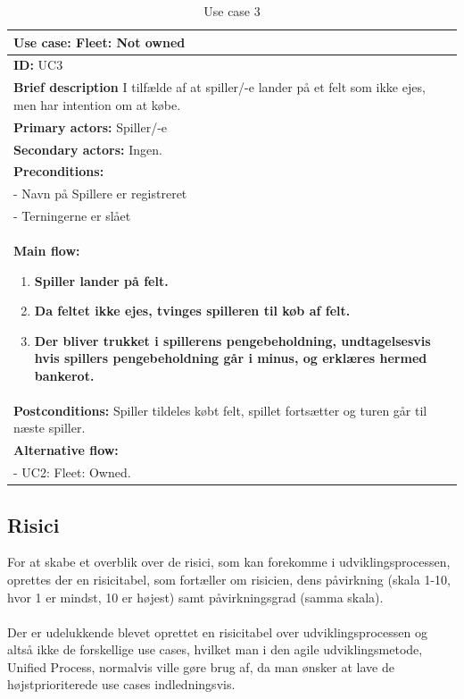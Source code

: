 \begin{table}[H]
    \begin{center}
        \begin{tabular}{ | p{15cm} |}
            \hline
            \textbf{Use case:} Fleet: Not owned \\ \hline
            \textbf{ID:} UC3 \\ \hline
            \textbf{Brief description} I tilfælde af at spiller/-e lander på et felt som ikke ejes, men har intention om at købe.    \\ \hline
            \textbf{Primary actors:} Spiller/-e \\ \hline
            \textbf{Secondary actors:} Ingen. \\ \hline
            \textbf{Preconditions:}
            \\- Navn på Spillere er registreret
            \\- Terningerne er slået \\ \hline
            \textbf{Main flow:}
            \begin{enumerate}
                \item \textbf{Spiller lander på felt.}
                \item \textbf{Da feltet ikke ejes, tvinges spilleren til køb af felt.}
                \item \textbf{Der bliver trukket i spillerens pengebeholdning, undtagelsesvis hvis spillers pengebeholdning går i minus, og erklæres hermed bankerot.}
            \end{enumerate} \\ \hline
            \textbf{Postconditions:} Spiller tildeles købt felt, spillet fortsætter og turen går til næste spiller.\\ \hline
            \textbf{Alternative flow:}
            \\- UC2: Fleet: Owned.\\ \hline
            \hline
        \end{tabular}
        \caption{Use case 3}
        \label{usecase:3}
    \end{center}
\end{table}

\newpage
\subsection{Risici}
For at skabe et overblik over de risici, som kan forekomme i udviklingsprocessen, oprettes der en risicitabel, som fortæller om risicien, dens påvirkning (skala 1-10, hvor 1 er mindst, 10 er højest) samt påvirkningsgrad (samma skala). \\ \\
Der er udelukkende blevet oprettet en risicitabel over udviklingsprocessen og altså ikke de forskellige use cases, hvilket man i den agile udviklingsmetode, Unified Process, normalvis ville gøre brug af, da man ønsker at lave de højstprioriterede use cases indledningsvis.

